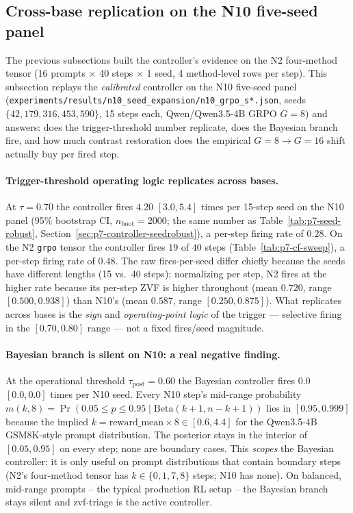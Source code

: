 \documentclass{article}
\begin{document}
\subsection{Cross-base replication on the N10 five-seed panel}
\label{sec:p7-controller-n10repl}
The previous subsections built the controller's evidence on the N2
four-method tensor (16 prompts $\times$ 40 steps $\times$ 1 seed,
4 method-level rows per step). This subsection replays the
\emph{calibrated} controller on the N10 five-seed panel
(\texttt{experiments/results/n10\_seed\_expansion/n10\_grpo\_s*.json},
seeds $\{42, 179, 316, 453, 590\}$, 15 steps each, Qwen/Qwen3.5-4B
GRPO $G{=}8$) and answers: does the trigger-threshold number
replicate, does the Bayesian branch fire, and how much contrast
restoration does the empirical $G{=}8 \to G{=}16$ shift actually
buy per fired step.

\paragraph{Trigger-threshold operating logic replicates across bases.}
At $\tau{=}0.70$ the controller fires $4.20$ $[3.0, 5.4]$ times
per 15-step seed on the N10 panel (95\% bootstrap CI, $n_{\text{boot}}{=}2000$;
the same number as Table~\ref{tab:p7-seed-robust},
Section~\ref{sec:p7-controller-seedrobust}), a per-step firing rate
of $0.28$. On the N2 \texttt{grpo} tensor the controller fires $19$
of $40$ steps (Table~\ref{tab:p7-cf-sweep}), a per-step firing rate
of $0.48$. The raw fires-per-seed differ chiefly because the seeds
have different lengths (15 vs.\ 40 steps); normalizing per step, N2
fires at the higher rate because its per-step ZVF is higher
throughout (mean $0.720$, range $[0.500, 0.938]$) than N10's
(mean $0.587$, range $[0.250, 0.875]$). What replicates across
bases is the \emph{sign} and \emph{operating-point logic} of the
trigger --- selective firing in the $[0.70, 0.80]$ range --- not a
fixed fires/seed magnitude.

\paragraph{Bayesian branch is silent on N10: a real negative finding.}
At the operational threshold $\tau_{\text{post}}{=}0.60$ the
Bayesian controller fires $0.0$ $[0.0, 0.0]$ times per N10 seed.
Every N10 step's mid-range probability
$m(k, 8) = \Pr(0.05 \le p \le 0.95 \mid \mathrm{Beta}(k{+}1, n{-}k{+}1))$
lies in $[0.95, 0.999]$ because the implied $k = \mathrm{reward\_mean}
\times 8 \in [0.6, 4.4]$ for the Qwen3.5-4B GSM8K-style prompt
distribution. The posterior stays in the interior of $[0.05, 0.95]$
on every step; none are boundary cases. This \emph{scopes} the
Bayesian controller: it is only useful on prompt distributions that
contain boundary steps (N2's four-method tensor has $k \in \{0, 1,
7, 8\}$ steps; N10 has none). On balanced, mid-range prompts --
the typical production RL setup -- the Bayesian branch stays
silent and zvf-triage is the active controller.
\end{document}
